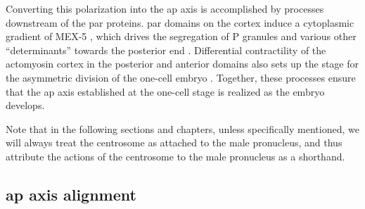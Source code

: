 Converting this polarization into the \ac{ap} axis is accomplished by processes downstream of the \ac{par} proteins. \ac{par} domains on the cortex induce a cytoplasmic gradient of MEX-5 \citep{schubert2000mex}, which drives the segregation of P granules and various other \enquote{determinants}  towards the posterior end \citep{hoege2013principles}. Differential contractility of the actomyosin cortex in the posterior and anterior domains also sets up the stage for the asymmetric division of the one-cell embryo \citep{grill2003distribution}. Together, these processes ensure that the \ac{ap} axis established at the one-cell stage is realized as the embryo develops.

Note that in the following sections and chapters, unless specifically mentioned, we will always treat the centrosome as attached to the male pronucleus, and thus attribute the actions of the centrosome to the male pronucleus as a shorthand.

\subsection{\acs{ap} axis alignment}\label{subsec:ApAxisAlignment}

